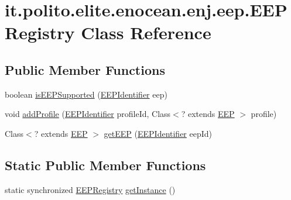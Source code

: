 \hypertarget{classit_1_1polito_1_1elite_1_1enocean_1_1enj_1_1eep_1_1_e_e_p_registry}{}\section{it.\+polito.\+elite.\+enocean.\+enj.\+eep.\+E\+E\+P\+Registry Class Reference}
\label{classit_1_1polito_1_1elite_1_1enocean_1_1enj_1_1eep_1_1_e_e_p_registry}
\subsection*{Public Member Functions}
\begin{DoxyCompactItemize}
\item 
boolean \hyperlink{classit_1_1polito_1_1elite_1_1enocean_1_1enj_1_1eep_1_1_e_e_p_registry_af87a47cf932bc9694acd4f56e82de8e9}{is\+E\+E\+P\+Supported} (\hyperlink{classit_1_1polito_1_1elite_1_1enocean_1_1enj_1_1eep_1_1_e_e_p_identifier}{E\+E\+P\+Identifier} eep)
\item 
void \hyperlink{classit_1_1polito_1_1elite_1_1enocean_1_1enj_1_1eep_1_1_e_e_p_registry_ab1e30930a41ca7f9232ecbaca8ddd3d7}{add\+Profile} (\hyperlink{classit_1_1polito_1_1elite_1_1enocean_1_1enj_1_1eep_1_1_e_e_p_identifier}{E\+E\+P\+Identifier} profile\+Id, Class$<$? extends \hyperlink{classit_1_1polito_1_1elite_1_1enocean_1_1enj_1_1eep_1_1_e_e_p}{E\+EP} $>$ profile)
\item 
Class$<$? extends \hyperlink{classit_1_1polito_1_1elite_1_1enocean_1_1enj_1_1eep_1_1_e_e_p}{E\+EP} $>$ \hyperlink{classit_1_1polito_1_1elite_1_1enocean_1_1enj_1_1eep_1_1_e_e_p_registry_a7c05134fa6795e1b8e21eb3719e78ddc}{get\+E\+EP} (\hyperlink{classit_1_1polito_1_1elite_1_1enocean_1_1enj_1_1eep_1_1_e_e_p_identifier}{E\+E\+P\+Identifier} eep\+Id)
\end{DoxyCompactItemize}
\subsection*{Static Public Member Functions}
\begin{DoxyCompactItemize}
\item 
static synchronized \hyperlink{classit_1_1polito_1_1elite_1_1enocean_1_1enj_1_1eep_1_1_e_e_p_registry}{E\+E\+P\+Registry} \hyperlink{classit_1_1polito_1_1elite_1_1enocean_1_1enj_1_1eep_1_1_e_e_p_registry_a671497d6d2a7f5fdfb5691fdfc5280c2}{get\+Instance} ()
\end{DoxyCompactItemize}


